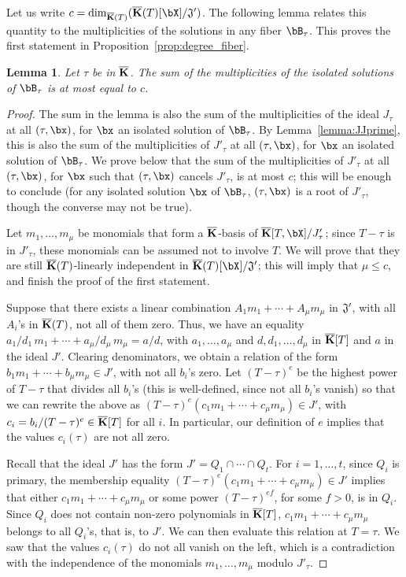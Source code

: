 \documentclass[12pt]{article}
\newtheorem{lemma}[definition]{Lemma}
\begin{document}
Let us write $c=\dim_{\KKbar(T)}(\KKbar(T)[\bX]/{\frak J}')$.  The
following lemma relates this quantity to the multiplicities of the
solutions in any fiber $\bB_\tau$. This proves the first statement
in Proposition~\ref{prop:degree_fiber}.

\begin{lemma}\label{lemma:19}
  Let $\tau$ be in $\overline{\mathbf{K}}$. The sum of the multiplicities of the
  isolated solutions of $\bB_\tau$ is at most equal to $c$.
\end{lemma}
\begin{proof}
  The sum in the lemma is also the sum of the multiplicities of the
  ideal $J_\tau$ at all $(\tau,\bx)$, for $\bx$ an isolated solution of
  $\bB_\tau$.  By Lemma~\ref{lemma:JJprime}, this is also the sum of
  the multiplicities of $J'_\tau$ at all $(\tau,\bx)$, for $\bx$ an
  isolated solution of $\bB_\tau$. We prove below that the sum of the
  multiplicities of $J'_\tau$ at all $(\tau,\bx)$, for $\bx$ such that
  $(\tau,\bx)$ cancels $J'_\tau$, is at most $c$; this will be enough
  to conclude (for any isolated solution $\bx$ of $\bB_\tau$,
  $(\tau,\bx)$ is a root of $J'_\tau$, though the converse may not be
  true).
  
  Let $m_1,\dots,m_\mu$ be monomials that form a $\overline{\mathbf{K}}$-basis of
  $\KKbar[T,\bX]/J'_\tau$; since $T-\tau$ is in $J'_\tau$, these
  monomials can be assumed not to involve $T$.  We will prove that
  they are still $\overline{\mathbf{K}}(T)$-linearly independent in
  $\KKbar(T)[\bX]/{\frak J}'$; this will imply that $\mu \le c$,
  and finish the proof of the first statement.
  
  Suppose that there exists a linear combination $A_1 m_1 + \cdots +
  A_\mu m_\mu$ in ${\frak J}'$, with all $A_i$'s in $\overline{\mathbf{K}}(T)$, not
  all of them zero. Thus, we have an equality $a_1/d_1\, m_1 + \cdots
  + a_\mu/d_\mu\, m_\mu = a/d$, with $a_1,\dots,a_\mu$ and
  $d,d_1,\dots,d_\mu$ in $\overline{\mathbf{K}}[T]$ and $a$ in the ideal
  $J'$. Clearing denominators, we obtain a relation of the form $b_1
  m_1 +\cdots+ b_\mu m_\mu \in J'$, with not all $b_i$'s zero. Let
  $(T-\tau)^e$ be the highest power of $T-\tau$ that divides all
  $b_i$'s (this is well-defined, since not all $b_i$'s vanish) so that
  we can rewrite the above as $(T-\tau)^e (c_1 m_1 +\cdots+ c_\mu
  m_\mu) \in J'$, with $c_i=b_i/(T-\tau)^e \in \overline{\mathbf{K}}[T]$ for all $i$.
  In particular, our definition of $e$ implies that the values
  $c_i(\tau)$ are not all zero.

  Recall that the ideal $J'$ has the form $J'=Q_1 \cap \cdots \cap
  Q_t$. For $i=1,\dots,t$, since $Q_i$ is primary, the membership
  equality $(T-\tau)^e (c_1 m_1 +\cdots +c_\mu m_\mu) \in J'$ implies
  that either $c_1 m_1 +\cdots +c_\mu m_\mu$ or some power
  $(T-\tau)^{ef}$, for some $f > 0$, is in $Q_i$. Since $Q_i$ does not
  contain non-zero polynomials in $\overline{\mathbf{K}}[T]$, $c_1 m_1 +\cdots+ c_\mu
  m_\mu$ belongs to all $Q_i$'s, that is, to $J'$. We can then
  evaluate this relation at $T=\tau$. We saw that the values
  $c_i(\tau)$ do not all vanish on the left, which is a contradiction
  with the independence of the monomials $m_1,\dots,m_\mu$ modulo
  $J'_\tau$.
\end{proof}
\end{document}
